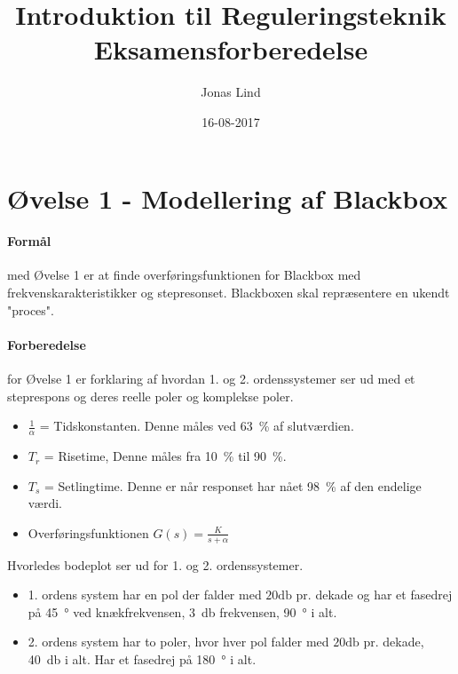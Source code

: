 \documentclass[danish]{article}
\begin{document}
\title{\textbf{ Introduktion til Reguleringsteknik }    Eksamensforberedelse}
\author{Jonas Lind}
\date{16-08-2017}
\maketitle
\tableofcontents
\newpage
\section{Øvelse 1 - Modellering af Blackbox}

\paragraph{Formål} med Øvelse 1 er at finde overføringsfunktionen for Blackbox med frekvenskarakteristikker og stepresonset.  Blackboxen skal repræsentere en ukendt "proces".
 
\paragraph{Forberedelse} for Øvelse 1 er forklaring af hvordan 1. og 2. ordenssystemer ser ud med et steprespons og deres reelle poler og komplekse poler.
\begin{itemize}
	\item $\frac{1}{\alpha}$ = Tidskonstanten. Denne måles ved \SI{63}{\percent} af slutværdien.
	\item $T_r$ = Risetime, Denne måles fra \SI{10}{\percent} til \SI{90}{\percent}.
	\item $T_s$ = Setlingtime. Denne er når responset har nået \SI{98}{\percent} af den endelige værdi.
	\item Overføringsfunktionen $G(s)= \frac{K}{s+\alpha}$
\end{itemize}

Hvorledes bodeplot ser ud for 1. og 2. ordenssystemer. 
\begin{itemize}
	\item 1. ordens system har en pol der falder med $20 \si{\decibel}$ pr. dekade og har et fasedrej på \SI{45}{\degree} ved knækfrekvensen, \SI{3}{\decibel} frekvensen, \SI{90}{\degree} i alt. 
	\item 2. ordens system har to poler, hvor hver pol falder med $20 \si{\decibel}$ pr. dekade, \SI{40}{\decibel} i alt. Har et fasedrej på \SI{180}{\degree} i alt. 
\end{itemize}
\end{document}
